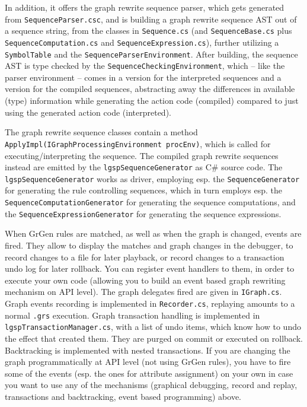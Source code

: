 In addition, it offers the graph rewrite sequence parser, which gets generated from \texttt{Sequence\-Parser.csc},
and is building a graph rewrite sequence AST out of a sequence string, from the classes in \texttt{Sequence.cs} (and \texttt{Sequence\-Base.cs} plus \texttt{Sequence\-Computation.cs} and \texttt{Sequence\-Expression.cs}), further utilizing a \texttt{Symbol\-Table} and the \texttt{Sequence\-Parser\-Environment}.
After building, the sequence AST is type checked by the \texttt{Sequence\-Checking\-Environment}, which -- like the parser environment -- comes in a version for the interpreted sequences and a version for the compiled sequences, abstracting away the differences in available (type) information while generating the action code (compiled) compared to just using the generated action code (interpreted).

The graph rewrite sequence classes contain a method \texttt{ApplyImpl(IGraph\-Processing\-Environment procEnv)}, which is called for executing/interpreting the sequence.
The compiled graph rewrite sequences instead are emitted by the \texttt{lgsp\-Sequence\-Generator} as C\# source code.
The \texttt{lgsp\-Sequence\-Generator} works as driver, employing esp. the \texttt{Sequence\-Generator} for generating the rule controlling sequences, which in turn employs esp. the \texttt{Sequence\-Computation\-Generator} for generating the sequence computations, and the \texttt{Sequence\-Expression\-Generator} for generating the sequence expressions.

When GrGen rules are matched, as well as when the graph is changed, events are fired.
They allow to display the matches and graph changes in the debugger,
to record changes to a file for later playback, or record changes to a transaction undo log for later rollback.
You can register event handlers to them, in order to execute your own code (allowing you to build an event based graph rewriting mechanism on API level).
The graph delegates fired are given in \texttt{IGraph.cs}.
Graph events recording is implemented in \texttt{Recorder.cs}, replaying amounts to a normal \texttt{.grs} execution.
Graph transaction handling is implemented in \texttt{lgsp\-Transaction\-Manager.cs}, with a list of undo items, which know how to undo the effect that created them.
They are purged on commit or executed on rollback.
Backtracking is implemented with nested transactions.
If you are changing the graph programmatically at API level (not using GrGen rules), you have to fire some of the events (esp. the ones for attribute assignment) on your own in case you want to use any of the mechanisms (graphical debugging, record and replay, transactions and backtracking, event based programming) above.


